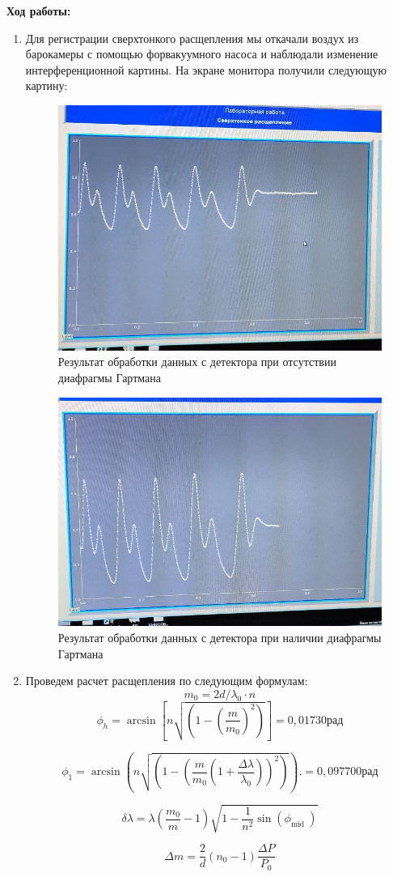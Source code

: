 \documentclass[a4paper, 12pt]{article}%
\begin{document}
	\textbf{Ход работы: }\\
	\begin{enumerate}
	\item Для регистрации сверхтонкого расщепления мы откачали воздух из барокамеры с помощью форвакуумного насоса и наблюдали изменение интерференционной картины. На экране монитора получили следующую картину:
	
	

	\begin{figure}[H]
	\centering
	\includegraphics[width=0.8\linewidth]{result.jpg}
	\caption{Результат обработки данных с детектора при отсутствии диафрагмы Гартмана}
	\end{figure}
	
 	\begin{figure}[H]
		\centering
		\includegraphics[width=0.8\linewidth]{result_1.jpg}
		\caption{Результат обработки данных с детектора при наличии диафрагмы Гартмана}
	\end{figure}
	
	\item Проведем расчет расщепления по следующим формулам: 
	$$ m_0 = 2d/\lambda_0 \cdot n $$
	$$ \phi_h=\arcsin \left[n \sqrt{\left(1-\left(\frac{m}{m_0}\right)^2\right)}\right] = 0,01730 \text{рад}$$
	
	$$ \phi_1=\arcsin \left(n\sqrt{\left(1-\left(\frac{m}{m_0}\left(1+\frac{\Delta \lambda}{\lambda_0}\right)\right)^2\right)} \right). = 0,097700 \text{рад}$$ 
	
	$$ \delta \lambda=\lambda\left(\frac{m_0}{m}-1\right) \sqrt{1-\frac{1}{n^2} \sin \left(\phi_{\text {mid }}\right)} $$

 	$$\Delta m = \frac{2}{d}(n_0 - 1)\frac{\Delta P}{P_0}$$
	\end{enumerate}
	 	
\end{document}
